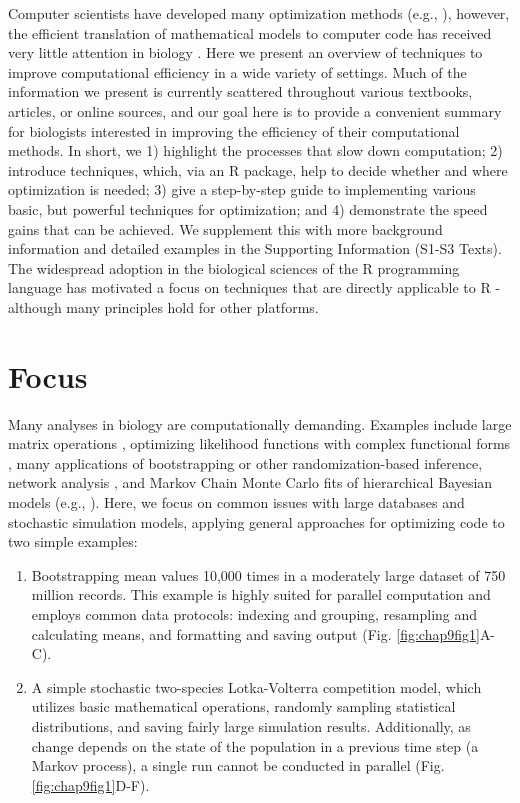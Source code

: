 \documentclass[b5paper,justified]{tufte-book} %
\begin{document}
\begin{fullwidth}
Computer scientists have developed many optimization methods (e.g., \citealt{Hager2010}), however, the efficient translation of mathematical models to computer code has received very little attention in biology \citep{Petrovskii2012}. Here we present an overview of techniques to improve computational efficiency in a wide variety of settings. Much of the information we present is currently scattered throughout various textbooks, articles, or online sources, and our goal here is to provide a convenient summary for biologists interested in improving the efficiency of their computational methods. In short, we 1) highlight the processes that slow down computation; 2) introduce techniques, which, via an R package, help to decide whether and where optimization is needed; 3) give a step-by-step guide to implementing various basic, but powerful techniques for optimization; and 4) demonstrate the speed gains that can be achieved. We supplement this with more background information and detailed examples in the Supporting Information (S1-S3 Texts). The widespread adoption in the biological sciences of the R programming language has motivated a focus on techniques that are directly applicable to R - although many principles
hold for other platforms. 

\section{Focus}

Many analyses in biology are computationally demanding. Examples include large matrix operations \citep{Zuidema2010}, optimizing likelihood functions with complex functional forms \citep{Putten2012}, many applications of bootstrapping or other randomization-based inference, network analysis \citep{Nagarajan2013}, and Markov Chain Monte Carlo fits of hierarchical Bayesian models (e.g., \citealt{Comita2010}). Here, we focus on common issues with large databases and stochastic simulation models, applying general approaches for optimizing code to two simple examples:

\begin{enumerate}
\item Bootstrapping mean values 10,000 times in a moderately large dataset of 750 million records. This example is highly suited for parallel computation and employs common data protocols: indexing and grouping, resampling and calculating means, and formatting and saving output (Fig. \ref{fig:chap9fig1}A-C).
\item A simple stochastic two-species Lotka-Volterra competition model, which utilizes basic mathematical operations, randomly sampling statistical distributions, and saving fairly large simulation results. Additionally, as change depends on the state of the population in a previous time step (a Markov process), a single run cannot be conducted in parallel (Fig. \ref{fig:chap9fig1}D-F).
\end{enumerate}


\end{fullwidth}
\end{document}
